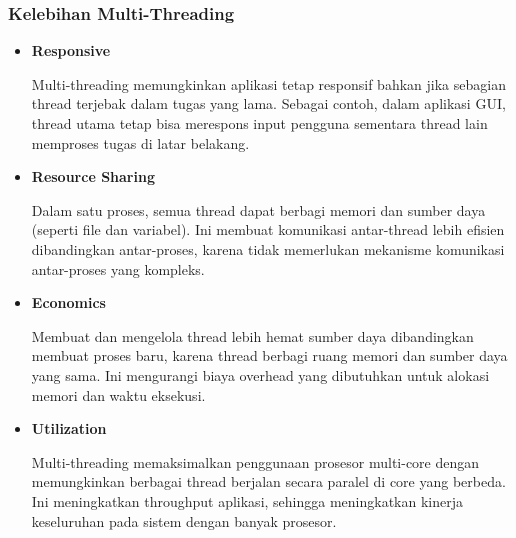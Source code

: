 \documentclass[12pt]{article}
\begin{document}
\begin{itemize}
\subsubsection{Kelebihan Multi-Threading}
\begin{itemize}
    \item\textbf{Responsive} 
    \par \hspace{2em} Multi-threading memungkinkan aplikasi tetap responsif bahkan jika sebagian thread terjebak dalam tugas yang lama. Sebagai contoh, dalam aplikasi GUI, thread utama tetap bisa merespons input pengguna sementara thread lain memproses tugas di latar belakang.
    \item\textbf{Resource Sharing}
    \par \hspace{2em} Dalam satu proses, semua thread dapat berbagi memori dan sumber daya (seperti file dan variabel). Ini membuat komunikasi antar-thread lebih efisien dibandingkan antar-proses, karena tidak memerlukan mekanisme komunikasi antar-proses yang kompleks.
    \item\textbf{Economics}
    \par \hspace{2em} Membuat dan mengelola thread lebih hemat sumber daya dibandingkan membuat proses baru, karena thread berbagi ruang memori dan sumber daya yang sama. Ini mengurangi biaya overhead yang dibutuhkan untuk alokasi memori dan waktu eksekusi.
    \item\textbf{Utilization}
    \par \hspace{2em} Multi-threading memaksimalkan penggunaan prosesor multi-core dengan memungkinkan berbagai thread berjalan secara paralel di core yang berbeda. Ini meningkatkan throughput aplikasi, sehingga meningkatkan kinerja keseluruhan pada sistem dengan banyak prosesor.
\end{itemize}


\end{itemize}
\end{document}
